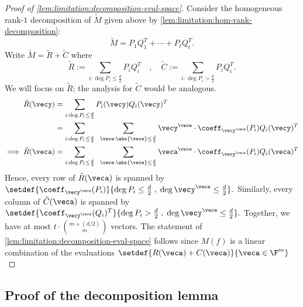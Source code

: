 \begin{proof}[Proof of \autoref{lem:limitation:decomposition-eval-space}]
  Consider the homogeneous rank-$1$ decomposition of $\tilde{M}$ given above by \autoref{lem:limitation:hom-rank-decomposition}:
  \[
    \tilde{M} = P_1 Q_1^T + \cdots + P_t Q_t^T.
  \]
  Write $\tilde{M} = \tilde{R} + \tilde{C}$ where
  \[
\tilde{R} := \sum_{i: \deg P_i \leq \frac{d}{2}} P_i Q_i^T\quad,\quad \tilde{C} := \sum_{i: \deg P_i > \frac{d}{2}} P_i Q_i^T.
  \]
  We will focus on $\tilde{R}$; the analysis for $\tilde{C}$ would be analogous.
  \begin{align*}
    \tilde{R}(\vecy) & = \sum_{i: \deg P_i \leq \frac{d}{2}} P_i(\vecy)  Q_i(\vecy)^T\\
             & = \sum_{i: \deg P_i \leq \frac{d}{2}}\;\; \sum_{\vece: \abs{\vece} \leq \frac{d}{2}} \vecy^{\vece} \cdot \coeff_{\vecy^{\vece}}(P_i)  Q_i (\vecy)^T\\
    \implies \tilde{R}(\veca) & = \sum_{i: \deg P_i \leq \frac{d}{2}}\;\; \sum_{\vece: \abs{\vece} \leq \frac{d}{2}} \veca^{\vece} \cdot \coeff_{\vecy^{\vece}}(P_i)  Q_i (\veca)^T
  \end{align*}
  Hence, every row of $\tilde{R}(\veca)$ is spanned by $\setdef{\coeff_{\vecy^{\vece}}(P_i)}{\deg P_i \leq \frac{d}{2}\;,\; \deg \vecy^{\vece} \leq \frac{d}{2}}.$  Similarly, every column of $\tilde{C}(\veca)$ is spanned by $\setdef{\coeff_{\vecy^{\vece}}(Q_i)^T}{\deg P_i > \frac{d}{2}\;,\; \deg \vecy^{\vece} \leq \frac{d}{2}}.$ Together, we have at most $t \cdot \binom{m + (d/2)}{m}$ vectors. 
The statement of \autoref{lem:limitation:decomposition-eval-space} follows since $M(f)$ is a linear combination of the evaluations $\setdef{R(\veca)+C(\veca)}{\veca\in \F^m}$   
\end{proof}

\subsection*{Proof of the decomposition lemma}

